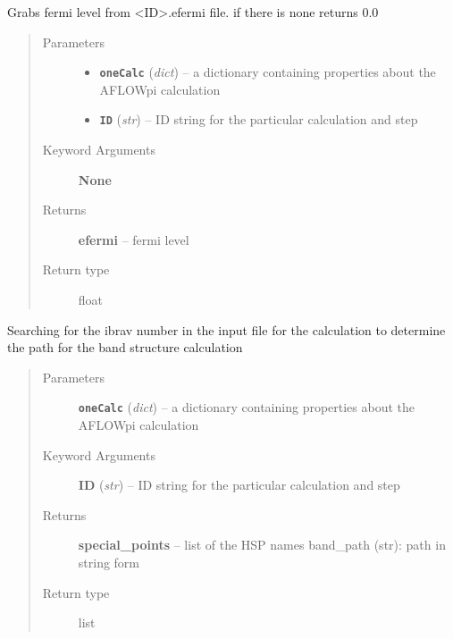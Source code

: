 \documentclass[letterpaper,10pt,english]{sphinxmanual}
\begin{document}

\begin{fulllineitems}
\label{retr:retr.__getEfermi}
Grabs fermi level from \textless{}ID\textgreater{}.efermi file. if there is none returns 0.0
\begin{quote}\begin{description}
\item[{Parameters}] \leavevmode\begin{itemize}
\item {} 
\textbf{\texttt{oneCalc}} (\emph{dict}) -- a dictionary containing properties about the AFLOWpi calculation

\item {} 
\textbf{\texttt{ID}} (\emph{str}) -- ID string for the particular calculation and step

\end{itemize}

\item[{Keyword Arguments}] \leavevmode
\textbf{None}

\item[{Returns}] \leavevmode
\textbf{efermi} --
fermi level

\item[{Return type}] \leavevmode
float

\end{description}\end{quote}

\end{fulllineitems}


\begin{fulllineitems}
\label{retr:retr.__getHighSymPoints}
Searching for the ibrav number in the input file for the calculation
to determine the path for the band structure calculation
\begin{quote}\begin{description}
\item[{Parameters}] \leavevmode
\textbf{\texttt{oneCalc}} (\emph{dict}) -- a dictionary containing properties about the AFLOWpi calculation

\item[{Keyword Arguments}] \leavevmode
\textbf{ID} (\emph{str}) --
ID string for the particular calculation and step

\item[{Returns}] \leavevmode
\textbf{special\_points} --
list of the HSP names
band\_path (str): path in string form

\item[{Return type}] \leavevmode
list

\end{description}\end{quote}

\end{fulllineitems}
\end{document}
